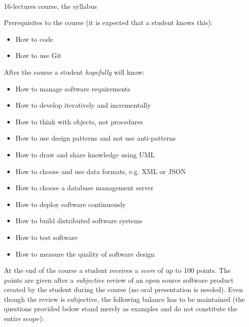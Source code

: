 \documentclass[nobrand,anonymous,nodate,nosecurity]{huawei}
\begin{document}
{\\
16-lectures course, the syllabus}

Prerequisites to the course (it is expected that a student knows this):

\begin{itemize}
\item How to code
\item How to use Git
\end{itemize}

After the course a student \emph{hopefully} will know:

\begin{itemize}
\item How to manage software requirements
\item How to develop iteratively and incrementally
\item How to think with objects, not procedures
\item How to use design patterns and not use anti-patterns
\item How to draw and share knowledge using UML
\item How to choose and use data formats, e.g. XML or JSON
\item How to choose a database management server
\item How to deploy software continuously
\item How to build distributed software systems
\item How to test software
\item How to measure the quality of software design
\end{itemize}

At the end of the course a student receives a \emph{score} of up
to 100 points. The points are given after a \emph{subjective} review
of an open source software product created by the student during the
course (no oral presentation is needed).
Even though the review is subjective, the following
balance has to be maintained (the questions provided below
stand merely as examples and do not constitute the entire scope):
\end{document}
